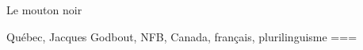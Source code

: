 Le mouton noir

Québec, Jacques Godbout, NFB, Canada, français, plurilinguisme
===
\nocite{godbout1992}